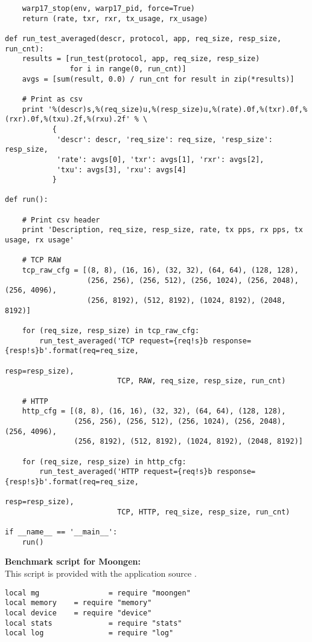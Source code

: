 \begin{landscape}
\begin{verbatim}
    warp17_stop(env, warp17_pid, force=True)
    return (rate, txr, rxr, tx_usage, rx_usage)

def run_test_averaged(descr, protocol, app, req_size, resp_size, run_cnt):
    results = [run_test(protocol, app, req_size, resp_size)
               for i in range(0, run_cnt)]
    avgs = [sum(result, 0.0) / run_cnt for result in zip(*results)]

    # Print as csv
    print '%(descr)s,%(req_size)u,%(resp_size)u,%(rate).0f,%(txr).0f,%(rxr).0f,%(txu).2f,%(rxu).2f' % \
           {
            'descr': descr, 'req_size': req_size, 'resp_size': resp_size,
            'rate': avgs[0], 'txr': avgs[1], 'rxr': avgs[2],
            'txu': avgs[3], 'rxu': avgs[4]
           }

def run():

    # Print csv header
    print 'Description, req_size, resp_size, rate, tx pps, rx pps, tx usage, rx usage'

    # TCP RAW
    tcp_raw_cfg = [(8, 8), (16, 16), (32, 32), (64, 64), (128, 128),
                   (256, 256), (256, 512), (256, 1024), (256, 2048), (256, 4096),
                   (256, 8192), (512, 8192), (1024, 8192), (2048, 8192)]

    for (req_size, resp_size) in tcp_raw_cfg:
        run_test_averaged('TCP request={req!s}b response={resp!s}b'.format(req=req_size,
                                                                           resp=resp_size),
                          TCP, RAW, req_size, resp_size, run_cnt)

    # HTTP
    http_cfg = [(8, 8), (16, 16), (32, 32), (64, 64), (128, 128),
                (256, 256), (256, 512), (256, 1024), (256, 2048), (256, 4096),
                (256, 8192), (512, 8192), (1024, 8192), (2048, 8192)]

    for (req_size, resp_size) in http_cfg:
        run_test_averaged('HTTP request={req!s}b response={resp!s}b'.format(req=req_size,
                                                                            resp=resp_size),
                          TCP, HTTP, req_size, resp_size, run_cnt)

if __name__ == '__main__':
    run()
\end{verbatim}

\textbf{Benchmark script for Moongen:}\\
This script is provided with the application source \cite{moongenbm}.
\begin{verbatim}
local mg                = require "moongen"
local memory    = require "memory"
local device    = require "device"
local stats             = require "stats"
local log               = require "log"


\end{verbatim}
\end{landscape}
